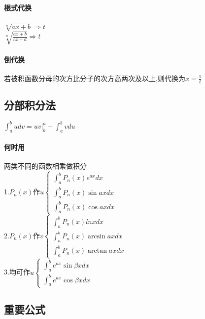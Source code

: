 \documentclass{article}
\begin{document}
\begin{flushleft}
	\paragraph{根式代换}
	$\sqrt[n]{ax+b} \Rightarrow t$\\
	$\sqrt[n]{\frac{ax+b}{cx+d}} \Rightarrow t$\\
	\paragraph{倒代换}
	若被积函数分母的次方比分子的次方高两次及以上,则代换为$x=\frac{1}{t}$\\
	
	\subsection{分部积分法}
	
	$\int_{a}^{b}udv=uv|_b^a-\int_{a}^{b}vdu$\\
	\paragraph{何时用}
	两类不同的函数相乘做积分\\
	1.$P_n(x)$作$u \left\{
	\begin{array}{lcl}
	\int_{a}^{b} P_n(x)e^{ax}dx\\
	\int_{a}^{b} P_n(x)\sin axdx\\
	\int_{a}^{b} P_n(x)\cos axdx
	\end{array} \right.$\\
	2.$P_n(x)$作$v \left\{
	\begin{array}{lcl}
	\int_{a}^{b} P_n(x)lnxdx\\
	\int_{a}^{b} P_n(x)\arcsin axdx\\
	\int_{a}^{b} P_n(x)\arctan axdx
	\end{array} \right.$\\
	3.均可作$u \left\{
	\begin{array}{lcl}
	\int_{a}^{b} e^{ax}\sin \beta xdx\\
	\int_{a}^{b} e^{ax}\cos \beta xdx
	\end{array} \right.$\\
	
	\subsection{重要公式}
	

\end{flushleft}
\end{document}
